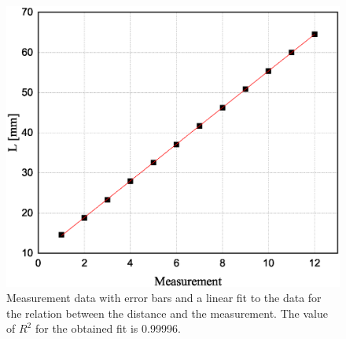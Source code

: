 \documentclass[a4paper]{report}
\begin{document}
		\begin{figure}[H]
		\centering
		\includegraphics[width=0.8\linewidth]{2.eps}
		\caption{Measurement data with error bars and a linear fit to the data for the relation between the distance and the measurement. The value of $R^2$ for the obtained fit is 0.99996.}
		\label{fig:2}
	\end{figure}
\end{document}
